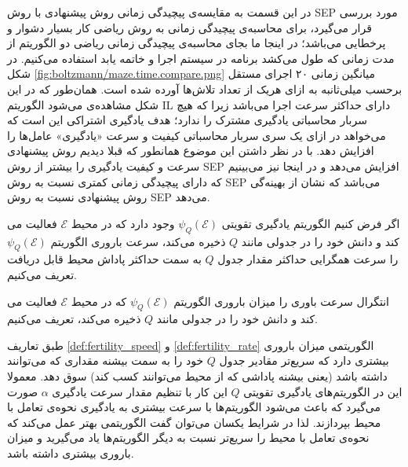  در این قسمت به مقایسه‌‌ی پیچیدگی زمانی روش پیشنهادی با روش SEP مورد بررسی قرار می‌گیرد، برای محاسبه‌ی پیچیدگی زمانی به روش ریاضی کار بسیار دشوار و پرخطایی می‌باشد؛ در اینجا ما بجای محاسبه‌ی پیچیدگی زمانی ریاضی دو الگوریتم از مدت زمانی که طول می‌کشد برنامه در سیستم اجرا و خاتمه یابد استفاده می‌کنیم. در شکل
\ref{fig:boltzmann/maze.time.compare.png}
میانگین زمانی ۲۰ اجرای مستقل برحسب میلی‌ثانبه به ازای هریک از تعداد تلاش‌ها آورده شده است. همان‌طور که در این شکل مشاهده‌ی می‌شود الگوریتم IL دارای حداکثر سرعت اجرا می‌باشد زیرا که هیچ سربار محاسباتی یادگیری مشترک را ندارد؛ هدف یادگیری اشتراکی این است که می‌خواهد در ازای یک سری سربار محاسباتی کیفیت و سرعت «یادگیری» عامل‌ها را افزایش دهد. با در نظر داشتن این موضوع همانطور که قبلا دیدیم روش پیشنهادی سرعت و کیفیت یادگیری را بیشتر از روش SEP افزایش می‌دهد و در اینجا نیز می‌بینیم که دارای پیچیدگی زمانی کمتری نسبت به روش SEP می‌باشد که نشان از بهینه‌گی روش پیشنهادی نسبت به روش SEP می‌دهد.


\begin{definition}\setstretch{\thebaselinestretch}\label{def:fertility_speed}
اگر فرض کنیم الگوریتم یادگیری تقویتی $\psi_Q(\mathcal{E})$ وجود دارد که در محیط $\mathcal{E}$ فعالیت می کند و دانش خود را در جدولی مانند $Q$ ذخیره می‌کند، سرعت باروری الگوریتم $\psi_Q(\mathcal{E})$ را سرعت همگرایی حداکثر مقدار جدول $Q$ به سمت حداکثر پاداش محیط قابل دریافت تعریف می‌کنیم.
\end{definition}
\begin{definition}\setstretch{\thebaselinestretch}\label{def:fertility_rate}
انتگرال سرعت باوری را میزان باروری الگوریتم $\psi_Q(\mathcal{E})$ که در محیط $\mathcal{E}$ فعالیت می کند و دانش خود را در جدولی مانند $Q$ ذخیره می‌کند، تعریف می‌کنیم.
\end{definition}

\begin{theorem}\setstretch{\thebaselinestretch}\label{theorem:learning_speed}
طبق تعاریف \ref{def:fertility_speed} و \ref{def:fertility_rate} الگوریتمی میزان باروری بیشتری دارد که سریع‌تر مقادیر جدول $Q$ خود را به سمت بیشنه مقداری که می‌توانند داشته باشد (یعنی بیشنه پاداشی که از محیط می‌توانند کسب کند) سوق دهد. معمولا این در الگوریتم‌های یادگیری تقویتی $Q$ این کار با تنظیم مقدار سرعت یادگیری $\alpha$ صورت می‌گیرد که باعث می‌شود الگوریتم‌ها با سرعت بیشتری به یادگیری نحوه‌ی تعامل با محیط بپردازند. لذا در شرایط یکسان می‌توان گفت الگوریتمی بهتر عمل می‌کند که نحوه‌ی تعامل با محیط را سریع‌تر نسبت به دیگر الگوریتم‌ها یاد می‌گیرید و میزان باروری بیشتری داشته باشد.
\end{theorem}


